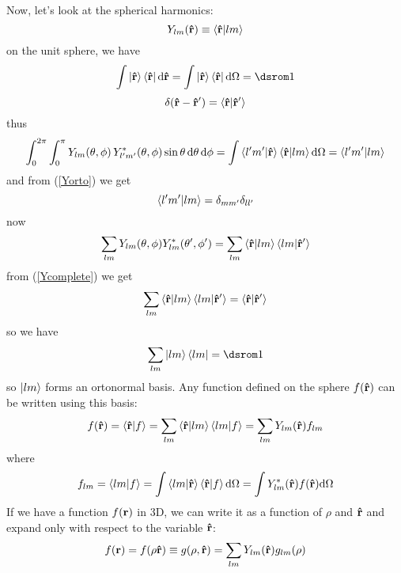 Now, let's look at the spherical harmonics: 
\begin{equation*}
  Y_{lm}({\bf\hat r})\equiv\mathinner{\langle{{\bf\hat r}|lm}\rangle}
\end{equation*}
on the unit sphere, we have 
\begin{equation*}
  \int\ket{\bf\hat r}\bra{\bf\hat r}\d{\bf\hat r}= \int\ket{\bf\hat r}\bra{\bf\hat r}\d\Omega=\one
\end{equation*}
\begin{equation*}
  \delta({\bf\hat r}-{\bf\hat r'})=\mathinner{\langle{{\bf\hat r}|{\bf\hat r'}}\rangle}
\end{equation*}
thus 
\begin{equation*}
  \int_0^{2\pi}\int_0^{\pi} Y_{lm}(\theta,\phi)\,Y^*_{l'm'}(\theta,\phi)\sin\theta\,{\rm d}\theta\,{\rm d}\phi = \int\mathinner{\langle{l'm'|{\bf\hat r}}\rangle}\mathinner{\langle{{\bf\hat r}|lm}\rangle}{\rm d}\Omega= \mathinner{\langle{l'm'|lm}\rangle}
\end{equation*}
and from (\ref{Yorto}) we get 
\begin{equation*}
  \mathinner{\langle{l'm'|lm}\rangle}=\delta_{mm'}\delta_{ll'}
\end{equation*}
now 
\begin{equation*}
  \sum_{lm}Y_{lm}(\theta,\phi)Y_{lm}^*(\theta',\phi')= \sum_{lm}\mathinner{\langle{{\bf\hat r}|lm}\rangle}\mathinner{\langle{lm|{\bf\hat r'}}\rangle}
\end{equation*}
from (\ref{Ycomplete}) we get 
\begin{equation*}
  \sum_{lm}\mathinner{\langle{{\bf\hat r}|lm}\rangle}\mathinner{\langle{lm|{\bf\hat r'}}\rangle}= \mathinner{\langle{{\bf\hat r}|{\bf\hat r'}}\rangle}
\end{equation*}
so we have 
\begin{equation*}
  \sum_{lm}\ket{lm}\bra{lm}=\one
\end{equation*}
so $\mathinner{|{lm}\rangle}$ forms an ortonormal basis. Any function defined on the sphere $f({\bf\hat r})$ can be written using this basis: 
\begin{equation*}
  f({\bf\hat r}) =\mathinner{\langle{{\bf\hat r}|f}\rangle} =\sum_{lm}\mathinner{\langle{{\bf\hat r}|lm}\rangle}\mathinner{\langle{lm|f}\rangle} =\sum_{lm}Y_{lm}({\bf\hat r})f_{lm}
\end{equation*}
where 
\begin{equation*}
  f_{lm}=\mathinner{\langle{lm|f}\rangle}=\int\mathinner{\langle{lm|{\bf\hat r}}\rangle}\mathinner{\langle{{\bf\hat r}|f}\rangle}{\rm d}\Omega =\int Y_{lm}^*({\bf\hat r}) f({\bf\hat r}){\rm d}\Omega
\end{equation*}
If we have a function $f({\bf r})$ in 3D, we can write it as a function of $\rho$ and ${\bf\hat r}$ and expand only with respect to the variable ${\bf\hat r}$: 
\begin{equation*}
  f({\bf r})=f(\rho{\bf\hat r})\equiv g(\rho,{\bf\hat r})= \sum_{lm}Y_{lm}({\bf\hat r})g_{lm}(\rho)
\end{equation*}
